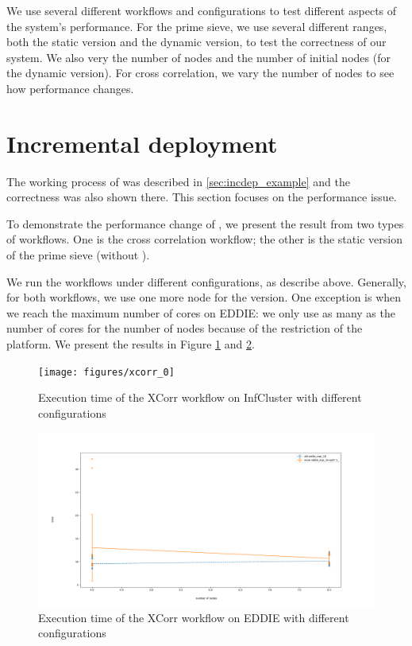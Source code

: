 We use several different workflows and configurations to test different aspects of the system's performance. For the prime sieve, we use several different ranges, both the static version and the dynamic version, to test the correctness of our system. We also very the number of nodes and the number of initial nodes (for the dynamic version). For cross correlation, we vary the number of nodes to see how performance changes.

\section{Incremental deployment}
The working process of \tincdep was described in \ref{sec:incdep_example} and the correctness was also shown there. This section focuses on the performance issue.

To demonstrate the performance change of \tincdep, we present the result from two types of workflows. One is the cross correlation workflow; the other is the static version of the prime sieve (without \tdynexp).

We run the workflows under different configurations, as describe above. Generally, for both workflows, we use one more node for the \tincdep version. One exception is when we reach the maximum number of cores on EDDIE: we only use as many as the number of cores for the number of nodes because of the restriction of the platform. We present the results in Figure \ref{fig:xcorr_0} and \ref{fig:xcorr_eddie}.

\begin{figure}[h]
\centering
    \texttt{[image: figures/xcorr\_0]}
\caption{Execution time of the XCorr workflow on InfCluster with different configurations}
\label{fig:xcorr_0}
\end{figure}

\begin{figure}[h]
\centering
    \includegraphics[width=1\textwidth]{figures/xcorr_eddie}
\caption{Execution time of the XCorr workflow on EDDIE with different configurations}
\label{fig:xcorr_eddie}
\end{figure}

